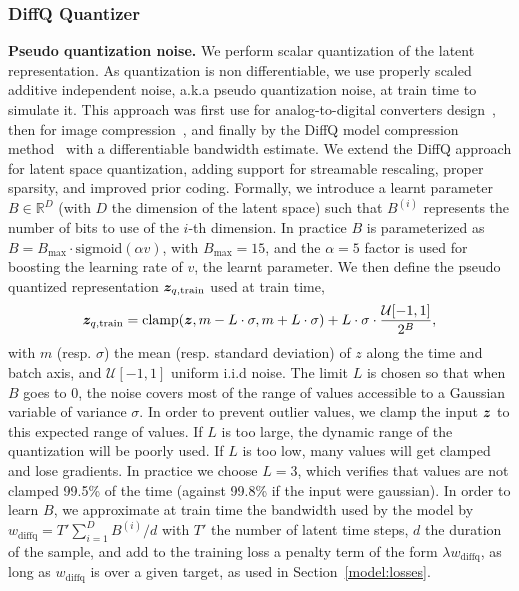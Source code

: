 \subsubsection{DiffQ Quantizer}
\label{model:diffq}
\textbf{Pseudo quantization noise.}
We perform scalar quantization of the latent representation. As quantization is non differentiable,
we use properly scaled additive independent noise, a.k.a pseudo quantization noise, at train time to simulate it. This approach was first use for analog-to-digital converters design~\citep{widrow1996statistical}, then for image compression~\citep{balle2017end},
and finally by the DiffQ model compression method~\citep{defossez2021differentiable} with a differentiable bandwidth estimate. 
We extend the DiffQ approach for latent space quantization, adding
support for streamable 
rescaling, proper sparsity, and improved prior coding. Formally, we introduce 
a learnt parameter $B\in \mathbb{R}^D$ (with $D$ the dimension of the latent space) such that $B^{(i)}$ represents the number of bits to use of the $i$-th dimension. 
In practice $B$ is parameterized as $B = B_{\max} \cdot \mathrm{sigmoid}(\alpha v)$, with $B_{\max} = 15$, and the $\alpha = 5$ factor is used for boosting the learning rate of $v$, the learnt parameter. We then define the pseudo quantized representation $\bm{z}_{q,\mathrm{train}}$ used at train time,
\begin{equation}
    \label{eq:dq_train}
    \bm{z}_{q,\mathrm{train}} = \mathrm{clamp}(\bm{z}, m - L\cdot\sigma, m + L\cdot\sigma) + L\cdot\sigma\cdot  \frac{\mathcal{U}[-1, 1]}{2^B},
\end{equation}
with $m$ (resp. $\sigma$) the mean (resp. standard deviation) of $z$ along the time and batch axis, and $\mathcal{U}[-1, 1]$ uniform i.i.d noise.
The limit $L$ is chosen so that when $B$ goes to 0, the noise covers most of the range of values accessible to a Gaussian variable of variance $\sigma$.
In order to prevent outlier values, we clamp the input $\bm{z}$ to this expected range of values. If $L$ is too large,
the dynamic range of the quantization will be poorly used. If $L$ is too low, many values will get clamped and lose gradients. In practice we choose $L = 3$, which verifies that values are not clamped 99.5\% of the time (against 99.8\% if the input were gaussian).
In order to learn $B$, we approximate at train time the bandwidth used by the model by $w_\mathrm{diffq} = T' \sum_{i=1}^D B^{(i)} / d$ with $T'$ the number of latent time steps, $d$ the duration of the sample,
and add to the training loss a penalty term of the form $\lambda w_\mathrm{diffq}$, as long as $w_\mathrm{diffq}$ is over a given target, as used in Section~\ref{model:losses}.

